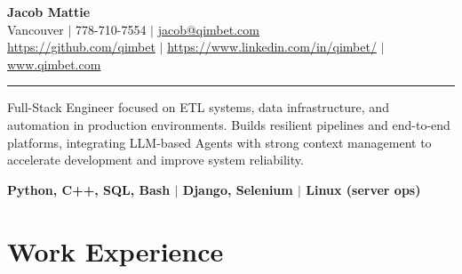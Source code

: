 \documentclass[a4paper,10pt]{article}
\begin{document}
	\begin{center}
		{\huge \bfseries Jacob Mattie} \\[0.75em]
		Vancouver $|$ 778-710-7554 $|$ 
		\href{mailto:jacob@qimbet.com}{jacob@qimbet.com} \\
		[0.15em]
		
		\href{https://github.com/qimbet}{https://github.com/qimbet} $|$ \href{https://www.linkedin.com/in/qimbet/}{https://www.linkedin.com/in/qimbet/}  $|$
		\href{www.qimbet.com}{www.qimbet.com}
		
	\end{center}
	
	\vspace{-1em}	
	\noindent\rule{\textwidth}{0.4pt}
	\vspace{-0.5em}
	
	\noindent
	Full-Stack Engineer focused on ETL systems, data infrastructure, and automation in production environments. Builds resilient pipelines and end-to-end platforms, integrating LLM-based Agents with strong context management to accelerate development and improve system reliability. 

	
	\vspace{-1mm}
	
	\begin{center}
		\textbf{
			Python, C++, SQL, Bash \quad $|$ \quad Django, Selenium \quad $|$ \quad Linux (server ops) \\
		}
		\vspace{1em}
		
		
	\end{center}

	
	\vspace{-1em}
\section*{Work Experience}
	\vspace{-0.65em}
	
\end{document}
